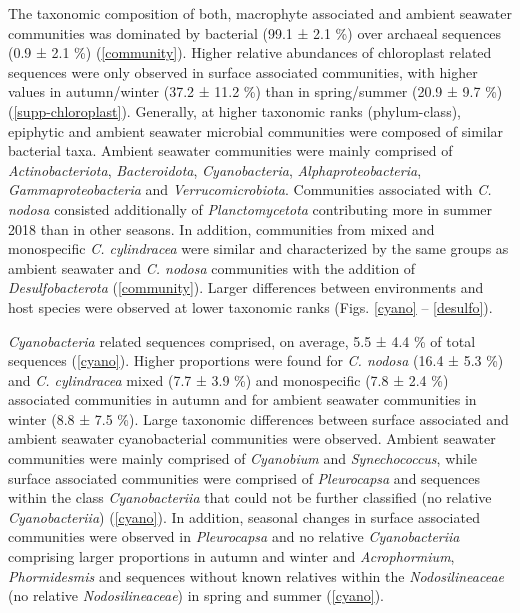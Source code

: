 \documentclass[12pt,]{article}
\begin{document}
The taxonomic composition of both, macrophyte associated and ambient
seawater communities was dominated by bacterial (99.1 ± 2.1
\si{\percent}) over archaeal sequences (0.9 ± 2.1 \si{\percent})
(\autoref{community}). Higher relative abundances of chloroplast related
sequences were only observed in surface associated communities, with
higher values in autumn/winter (37.2 ± 11.2 \si{\percent}) than in
spring/summer (20.9 ± 9.7 \si{\percent}) (\autoref{supp-chloroplast}).
Generally, at higher taxonomic ranks (phylum-class), epiphytic and
ambient seawater microbial communities were composed of similar
bacterial taxa. Ambient seawater communities were mainly comprised of
\emph{Actinobacteriota}, \emph{Bacteroidota}, \emph{Cyanobacteria},
\emph{Alphaproteobacteria}, \emph{Gammaproteobacteria} and
\emph{Verrucomicrobiota}. Communities associated with \emph{C. nodosa}
consisted additionally of \emph{Planctomycetota} contributing more in
summer 2018 than in other seasons. In addition, communities from mixed
and monospecific \emph{C. cylindracea} were similar and characterized by
the same groups as ambient seawater and \emph{C. nodosa} communities
with the addition of \emph{Desulfobacterota} (\autoref{community}).
Larger differences between environments and host species were observed
at lower taxonomic ranks (Figs. \ref{cyano} -- \ref{desulfo}).

\emph{Cyanobacteria} related sequences comprised, on average, 5.5 ± 4.4
\si{\percent} of total sequences (\autoref{cyano}). Higher proportions
were found for \emph{C. nodosa} (16.4 ± 5.3 \si{\percent}) and \emph{C.
cylindracea} mixed (7.7 ± 3.9 \si{\percent}) and monospecific (7.8 ± 2.4
\si{\percent}) associated communities in autumn and for ambient seawater
communities in winter (8.8 ± 7.5 \si{\percent}). Large taxonomic
differences between surface associated and ambient seawater
cyanobacterial communities were observed. Ambient seawater communities
were mainly comprised of \emph{Cyanobium} and \emph{Synechococcus},
while surface associated communities were comprised of
\emph{Pleurocapsa} and sequences within the class \emph{Cyanobacteriia}
that could not be further classified (no relative \emph{Cyanobacteriia})
(\autoref{cyano}). In addition, seasonal changes in surface associated
communities were observed in \emph{Pleurocapsa} and no relative
\emph{Cyanobacteriia} comprising larger proportions in autumn and winter
and \emph{Acrophormium}, \emph{Phormidesmis} and sequences without known
relatives within the \emph{Nodosilineaceae} (no relative
\emph{Nodosilineaceae}) in spring and summer (\autoref{cyano}).
\end{document}
